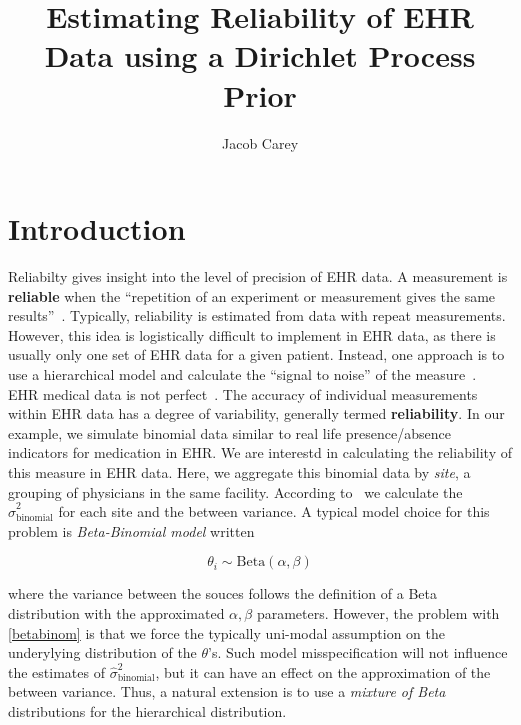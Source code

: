 \documentclass{article}
\begin{document}
\title{Estimating Reliability of EHR Data using a Dirichlet Process Prior}
\author{Jacob Carey}

\maketitle

\section{Introduction}

Reliabilty gives insight into the level of precision of EHR data. A measurement is \textbf{reliable} when the ``repetition of an experiment or measurement gives the same results''~\cite{porta2008}. Typically, reliability is estimated from data with repeat measurements. However, this idea is logistically difficult to implement in EHR data, as there is usually only one set of EHR data for a given patient. Instead, one approach is to use a hierarchical model and calculate the ``signal to noise'' of the measure~\cite{Adams2009}. \\

EHR medical data is not perfect~\cite{kanger2014}. The accuracy of individual measurements within EHR data has a degree of variability, generally termed \textbf{reliability}.   In our example, we simulate binomial data similar to real life presence/absence indicators for medication in EHR. We are interestd in calculating the reliability of this measure in EHR data. Here, we aggregate this binomial data by \textit{site}, a grouping of physicians in the same facility. According to~\cite{Adams2009} we calculate the $\hat{\sigma}^2_{\text{binomial}}$ for each site and the between variance. A typical model choice for this problem is \textit{Beta-Binomial model} written

\begin{equation}\label{betabinom}
\theta_i \sim \text{Beta}(\alpha, \beta)
\end{equation}

where the variance between the souces follows the definition of a Beta distribution with the approximated $\alpha, \beta$ parameters. However, the problem with \eqref{betabinom} is that we force the typically uni-modal assumption on the underylying distribution of the $\theta$'s. Such model misspecification will not influence the estimates of $\hat{\sigma}^2_{\text{binomial}}$, but it can have an effect on the approximation of the between variance. Thus, a natural extension is to use a \textit{mixture of Beta} distributions for the hierarchical distribution.
\end{document}
